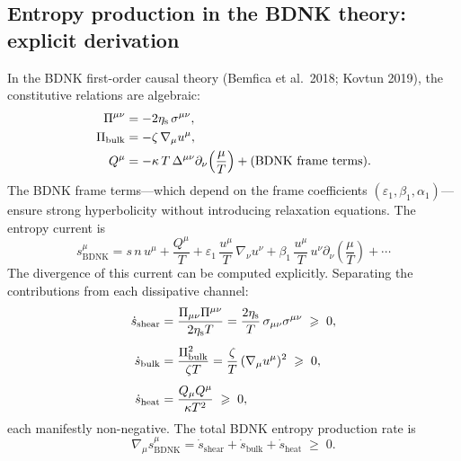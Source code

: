 \subsection{Entropy production in the BDNK theory: explicit
derivation}
\label{sec:rel-14-bdnk-explicit}

In the BDNK first-order causal theory (Bemfica et al.\ 2018;
Kovtun 2019), the constitutive relations are algebraic:
\begin{align}
\Pi^{\mu\nu} &= -2\eta_{\mathrm{s}}\,\sigma^{\mu\nu}, \label{eq:bdnk-shear-cr}\\
\Pi_{\mathrm{bulk}} &= -\zeta\,\nabla_\mu u^\mu, \\
Q^\mu &= -\kappa\,T\,\Delta^{\mu\nu}\partial_\nu\!\left(\frac{\mu}{T}\right)
+ \text{(BDNK frame terms)}.
\end{align}
The BDNK frame terms---which depend on the frame coefficients
$(\varepsilon_1,\beta_1,\alpha_1)$---ensure strong hyperbolicity
without introducing relaxation equations.  The entropy current is
\begin{equation}
\label{eq:bdnk-entropy-current-explicit}
s^\mu_{\mathrm{BDNK}} = s\,n\,u^\mu + \frac{Q^\mu}{T}
+ \varepsilon_1\,\frac{u^\mu}{T}\,\nabla_\nu u^\nu
+ \beta_1\,\frac{u^\mu}{T}\,u^\nu\partial_\nu\!\left(\frac{\mu}{T}\right)
+ \cdots
\end{equation}
The divergence of this current can be computed explicitly.
Separating the contributions from each dissipative channel:
\begin{align}
\dot{s}_{\mathrm{shear}}
&= \frac{\Pi_{\mu\nu}\Pi^{\mu\nu}}{2\eta_{\mathrm{s}} T}
= \frac{2\eta_{\mathrm{s}}}{T}\,\sigma_{\mu\nu}\sigma^{\mu\nu}
\;\geqslant\; 0, \label{eq:bdnk-s-shear}\\[4pt]
\dot{s}_{\mathrm{bulk}}
&= \frac{\Pi_{\mathrm{bulk}}^2}{\zeta T}
= \frac{\zeta}{T}\,(\nabla_\mu u^\mu)^2
\;\geqslant\; 0, \label{eq:bdnk-s-bulk}\\[4pt]
\dot{s}_{\mathrm{heat}}
&= \frac{Q_\mu Q^\mu}{\kappa T^2}
\;\geqslant\; 0, \label{eq:bdnk-s-heat}
\end{align}
each manifestly non-negative.  The total BDNK entropy production
rate is
\begin{equation}
\label{eq:bdnk-total-entropy}
\boxed{
\nabla_\mu s^\mu_{\mathrm{BDNK}}
= \dot{s}_{\mathrm{shear}} + \dot{s}_{\mathrm{bulk}}
+ \dot{s}_{\mathrm{heat}}
\;\geqslant\; 0.
}
\end{equation}

